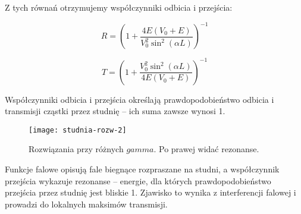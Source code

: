 Z tych równań otrzymujemy współczynniki odbicia i przejścia:

\begin{equation*}
    R = \left( 1 + \frac{4 E (V_0 + E)}{V_0^2 \sin^2(\alpha L)} \right) ^{-1}
\end{equation*}

\begin{equation*}
    T = \left( 1 + \frac{V_0^2 \sin^2(\alpha L)}{4 E (V_0 + E)} \right) ^{-1}
\end{equation*}

Współczynniki odbicia i przejścia określają prawdopodobieństwo odbicia i
transmisji cząstki przez studnię – ich suma zawsze wynosi 1.

\begin{figure}[H]
    \centering
    \texttt{[image: studnia-rozw-2]}
    \caption{Rozwiązania przy różnych $gamma$. Po prawej widać rezonanse.}
    \label{fig:studnia-rozw-2}
\end{figure}

Funkcje falowe opisują fale biegnące rozpraszane na studni, a współczynnik
przejścia wykazuje rezonanse – energie, dla których prawdopodobieństwo
przejścia przez studnię jest bliskie 1. Zjawisko to wynika z interferencji
falowej i prowadzi do lokalnych maksimów transmisji.
